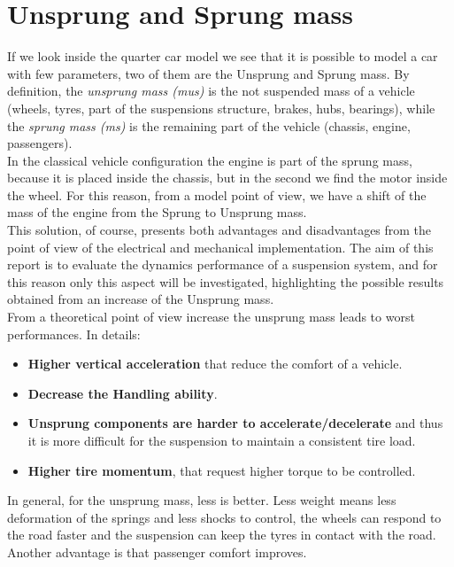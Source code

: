 \documentclass{article}
\numberwithin{equation}{section}
\numberwithin{figure}{section}
\numberwithin{table}{section}
\numberwithin{table}{section}
\begin{document}
\section{Unsprung and Sprung mass}
If we look inside the quarter car model we see that it is possible to model a car with few parameters, two of them are the Unsprung and Sprung mass. By definition, the \emph{unsprung mass (mus)}  is the not suspended mass of a vehicle (wheels, tyres, part of the suspensions structure, brakes, hubs, bearings), while the \emph{sprung mass (ms)} is the remaining part of the vehicle (chassis, engine, passengers).\\ 
In the classical vehicle configuration the engine is part of the sprung mass, because it is placed inside the chassis, but in the second we find the motor inside the wheel. %
For this reason, from a model point of view, we have a shift of the mass of the engine from the Sprung to Unsprung mass.\\
This solution, of course, presents both advantages and disadvantages from the point of view of the electrical and mechanical implementation. The aim of this report is to evaluate the dynamics performance of a suspension system, and for this reason only this aspect will be investigated, highlighting the possible results obtained from an increase of the Unsprung mass.\\
\newline
From a theoretical point of view increase the unsprung mass leads to worst performances. In details:
\begin{itemize}
    \item \textbf{Higher vertical acceleration} that reduce the comfort of a vehicle.
    \item \textbf{Decrease the Handling ability}.
    \item \textbf{Unsprung components are harder to accelerate/decelerate} and thus it is more difficult for the suspension to maintain a consistent tire load.
    \item \textbf{Higher tire momentum}, that request higher torque to be controlled.
\end{itemize}
In general, for the unsprung mass, less is better. Less weight means less deformation of the springs and less shocks to control, the wheels can respond to the road faster and the suspension can keep the tyres in contact with the road. Another advantage is that passenger comfort improves.\\
\end{document}
